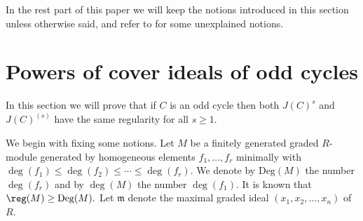 \documentclass[12pt]{amsart}
\begin{document}
    In the rest part of this paper  we will keep the notions introduced  in this section unless otherwise said, and refer to \cite{HH} for some unexplained notions.


\section{Powers of cover ideals of odd cycles}

In this section we will prove that if $C$ is an odd cycle then both $J(C)^{s}$ and $J(C)^{(s)}$ have the same regularity for all $s\geq 1$.

We begin with fixing some notions. Let $M$ be a finitely generated graded $R$-module generated by homogeneous elements $f_1,\ldots,f_r$ minimally with $\deg(f_1)\leq \deg(f_2)\leq \cdots \leq \deg(f_r)$. We denote  by $\mathrm{Deg}(M)$ the number $\deg(f_r)$ and by $\deg(M)$ the number $\deg(f_1)$. It is known that $\reg(M)\geq \mathrm{Deg}(M).$ Let $\mathfrak{m}$ denote the maximal graded ideal $(x_1,x_2,\ldots,x_n)$ of $R$.
\end{document}
